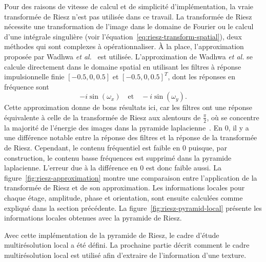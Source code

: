 Pour des raisons de vitesse de calcul et de simplicité d'implémentation, la vraie transformée de Riesz n'est pas utilisée dans ce travail. La transformée de Riesz nécessite une transformation de l'image dans le domaine de Fourier ou le calcul d'une intégrale singulière (voir l'équation~\ref{eq:riesz-transform-spatial}), deux méthodes qui sont complexes à opérationnaliser. À la place, l'approximation proposée par Wadhwa \textit{et al.}~\cite{wadhwa_riesz_2014} est utilisée. L'approximation de Wadhwa \textit{et al.} se calcule directement dans le domaine spatial en utilisant les filtres à réponse impulsionnelle finie $[-0.5, 0, 0.5]$ et $[-0.5, 0, 0.5]^T$, dont les réponses en fréquence sont
\begin{equation}
    -i\sin(\omega_x) \quad \text{et} \quad -i\sin(\omega_y).
\end{equation}
Cette approximation donne de bons résultats ici, car les filtres ont une réponse équivalente à celle de la transformée de Riesz aux alentours de $\frac\pi2$, où se concentre la majorité de l'énergie des images dans la pyramide laplacienne~\cite{wadhwa_riesz_2014}. En $0$, il y a une différence notable entre la réponse des filtres et la réponse de la transformée de Riesz. Cependant, le contenu fréquentiel est faible en $0$ puisque, par construction, le contenu basse fréquences est supprimé dans la pyramide laplacienne. L'erreur due à la différence en $0$ est donc faible aussi. La figure~\ref{fig:riesz-approximation} montre une comparaison entre l'application de la transformée de Riesz et de son approximation. Les informations locales pour chaque étage, amplitude, phase et orientation, sont ensuite calculées comme expliqué dans la section précédente. La figure~\ref{fig:riesz-pyramid-local} présente les informations locales obtenues avec la pyramide de Riesz.

\bigskip

Avec cette implémentation de la pyramide de Riesz, le cadre d'étude multirésolution local a été défini. La prochaine partie décrit comment le cadre multirésolution local est utilisé afin d'extraire de l'information d'une texture.

